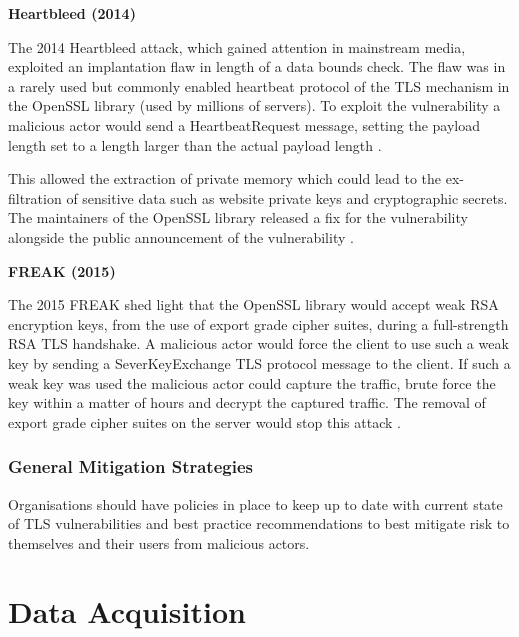 \documentclass{mscreport}
\begin{document}
\vspace{0.6cm} \noindent
\textbf{Heartbleed (2014)}


\vspace{0.2cm} \noindent
The 2014 Heartbleed attack, which gained attention in mainstream media, exploited an implantation flaw in length of a data bounds check. The flaw was in a rarely used but commonly enabled heartbeat protocol \cite{Durumeric2014-yj} of the TLS mechanism in the OpenSSL library (used by millions of servers). To exploit the vulnerability a malicious actor would send a HeartbeatRequest message, setting the payload length set to a length larger than the actual payload length \cite{Durumeric2014-yj}.

\vspace{0.3cm} \noindent
This allowed the extraction of private memory which could lead to the ex-filtration of sensitive data such as website private keys and cryptographic secrets. The maintainers of the OpenSSL library released a fix for the vulnerability alongside the public announcement of the vulnerability \cite{Durumeric2014-yj}.

\vspace{0.6cm} \noindent
\textbf{FREAK (2015)}

\vspace{0.2cm} \noindent
The 2015 FREAK shed light that the OpenSSL library would accept weak RSA encryption keys, from the use of export grade cipher suites, during a full-strength RSA TLS handshake. A malicious actor would force the client to use such a weak key by sending a SeverKeyExchange TLS protocol message to the client. If such a weak key was used the malicious actor could capture the traffic, brute force the key within a matter of hours and decrypt the captured traffic. The removal of export grade cipher suites on the server would stop this attack \cite{Ristic2017-aj,Beurdouche2015-ga}.

\subsubsection{General Mitigation Strategies}

Organisations should have policies in place to keep up to date with current state of TLS vulnerabilities and best practice recommendations to best mitigate risk to themselves and their users from malicious actors.

\newpage

\section{Data Acquisition}
\end{document}
